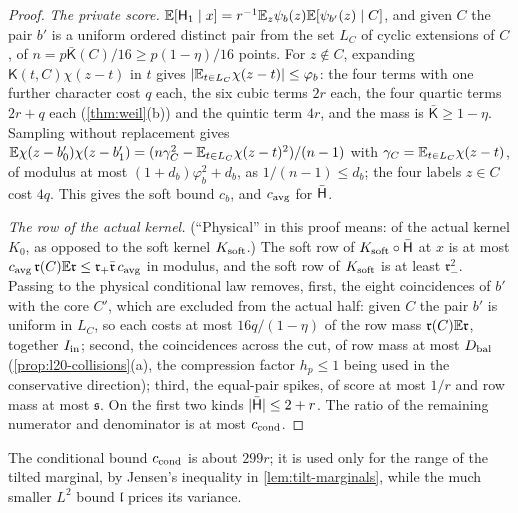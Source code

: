 \begin{proof}
\emph{The private score.} $\mathbb E[\mathsf H_{1}\mid x]=r^{-1}\mathbb E_z\psi_b(z)\mathbb E[\psi_{b'}(z)\mid C]$, and
given $C$ the pair $b'$ is a uniform ordered distinct pair from the set $L_C$ of cyclic
extensions of $C$, of $n=p\bar{\mathsf K}(C)/16\ge p(1-\eta)/16$ points. For $z\notin C$,
expanding $\mathsf K(t,C)\chi(z-t)$ in $t$ gives $|\mathbb E_{t\in L_C}\chi(z-t)|\le\varphi_b$: the four
terms with one further character cost $q$ each, the six cubic terms $2r$ each, the four
quartic terms $2r+q$ each (\cref{thm:weil}(b)) and the quintic term $4r$, and the mass is
$\bar{\mathsf K}\ge1-\eta$. Sampling without replacement gives
$\mathbb E\chi(z-b'_0)\chi(z-b'_1)=(n\gamma_C^2-\mathbb E_{t\in L_C}\chi(z-t)^2)/(n-1)$ with
$\gamma_C=\mathbb E_{t\in L_C}\chi(z-t)$, of modulus at most $(1+d_b)\varphi_b^2+d_b$, as
$1/(n-1)\le d_b$; the four labels $z\in C$ cost $4q$. This gives the soft bound $c_b$, and
$c_{\rm avg}$ for $\bar{\mathsf H}$.

\emph{The row of the actual kernel.} (``Physical'' in this proof
means: of the actual kernel $K_0$, as opposed to the soft kernel
$K_{\rm soft}$.) The soft row of $K_{\rm soft}\circ\bar{\mathsf H}$ at $x$ is at most
$c_{\rm avg}\,\mathfrak r(C)\mathbb E\mathfrak r\le\mathfrak r_+\bar{\mathfrak r}\,c_{\rm avg}$ in modulus, and
the soft row of $K_{\rm soft}$ is at least $\mathfrak r_-^2$. Passing to the physical
conditional law removes, first, the eight coincidences of $b'$ with the core $C'$, which
are excluded from the actual half: given $C$ the pair $b'$ is uniform in $L_C$, so each
costs at most $16q/(1-\eta)$ of the row mass $\mathfrak r(C)\mathbb E\mathfrak r$, together
$I_{\rm in}$; second, the coincidences across the cut, of row mass at most $D_{\rm bal}$
(\cref{prop:l20-collisions}(a), the compression factor $h_p\le1$ being used in the
conservative direction); third, the equal-pair spikes, of score at most $1/r$ and row mass
at most $\mathfrak s$. On the first two kinds $|\bar{\mathsf H}|\le2+r$. The ratio of the remaining
numerator and denominator is at most $c_{\rm cond}$.
\end{proof}

The conditional bound $c_{\rm cond}$ is about $299r$; it is used only for the range of the
tilted marginal, by Jensen's inequality in \cref{lem:tilt-marginals}, while the much
smaller $L^2$ bound $\mathfrak l$ prices its variance.


